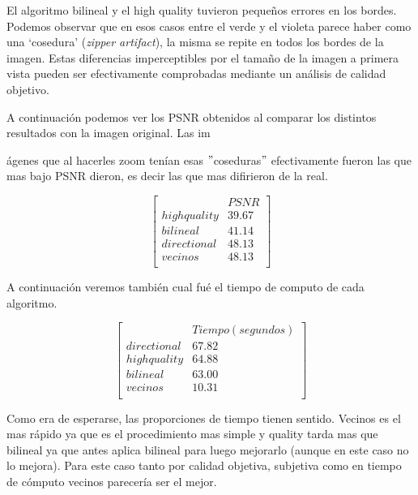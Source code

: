 El algoritmo bilineal y el high quality tuvieron pequeños errores en los bordes. Podemos observar que en esos casos entre el verde y el violeta parece haber como una `cosedura' (\textit{zipper artifact}), la misma se repite en todos los bordes de la imagen. Estas diferencias imperceptibles por el tamaño de la imagen a primera vista pueden ser efectivamente comprobadas mediante un análisis de calidad objetivo. 

A continuación podemos ver los PSNR obtenidos al comparar los distintos resultados con la imagen original. Las im{ágenes que al hacerles zoom tenían esas $"$coseduras$"$ efectivamente fueron las que mas bajo PSNR dieron, es decir las que mas difirieron de la real.

$$ 
\begin{bmatrix}
           &      PSNR     \\
       highquality    &   39.67   \\
       bilineal       &   41.14   \\
       directional    &   48.13    \\
       vecinos        &   48.13      \\
\end{bmatrix} 
$$

A continuación veremos también cual fué el tiempo de computo de cada algoritmo.

$$ 
\begin{bmatrix}
           &      Tiempo (segundos)     \\
       directional    &   67.82    \\
       highquality    &   64.88   \\
       bilineal       &   63.00   \\
       vecinos        &   10.31      \\
\end{bmatrix} 
$$

Como era de esperarse, las proporciones de tiempo tienen sentido. Vecinos es el mas rápido ya que es el procedimiento mas simple y quality tarda mas que bilineal ya que antes aplica bilineal para luego mejorarlo (aunque en este caso no lo mejora). Para este caso tanto por calidad objetiva, subjetiva como en tiempo de cómputo vecinos parecería ser el mejor.


\clearpage
}
